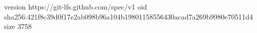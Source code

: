 version https://git-lfs.github.com/spec/v1
oid sha256:421f8c39d0f17e2ab098b96a104b19801158556430acad7a269b9980e70511d4
size 3758
